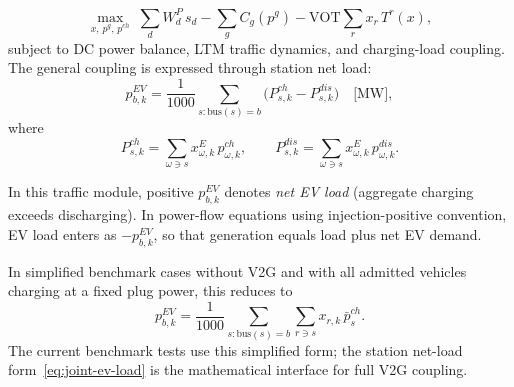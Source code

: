 \begin{equation}
  \max_{x,\,p^g,\,p^{ch}}\;
    \sum_{d} W^P_d\,s_d
    - \sum_g C_g(p^g)
    - \mathrm{VOT} \sum_r x_r\,T^r(x),
  \label{eq:joint-sw}
\end{equation}
subject to DC power balance, LTM traffic dynamics, and charging-load
coupling.  The general coupling is expressed through station net load:
\begin{equation}
  p^{EV}_{b,k}
  = \frac{1}{1000}
    \sum_{s:\mathrm{bus}(s)=b}
    \bigl(P^{ch}_{s,k} - P^{dis}_{s,k}\bigr)
    \quad\text{[MW]},
  \label{eq:joint-ev-load}
\end{equation}
where
\begin{equation}
  P^{ch}_{s,k}
  = \sum_{\omega\ni s} x^E_{\omega,k}\,p^{ch}_{\omega,k},
  \qquad
  P^{dis}_{s,k}
  = \sum_{\omega\ni s} x^E_{\omega,k}\,p^{dis}_{\omega,k}.
\end{equation}
\begin{remark}
  In this traffic module, positive $p^{EV}_{b,k}$ denotes \emph{net EV
  load} (aggregate charging exceeds discharging).  In power-flow equations
  using injection-positive convention, EV load enters as $-p^{EV}_{b,k}$,
  so that generation equals load plus net EV demand.
\end{remark}
In simplified benchmark cases without V2G and with all admitted vehicles
charging at a fixed plug power, this reduces to
\begin{equation}
  p^{EV}_{b,k}
  = \frac{1}{1000}
    \sum_{s:\mathrm{bus}(s)=b}
    \sum_{r\ni s} x_{r,k}\,\bar{p}^{ch}_s.
\end{equation}
The current benchmark tests use this simplified form; the station
net-load form~\eqref{eq:joint-ev-load} is the mathematical interface
for full V2G coupling.

